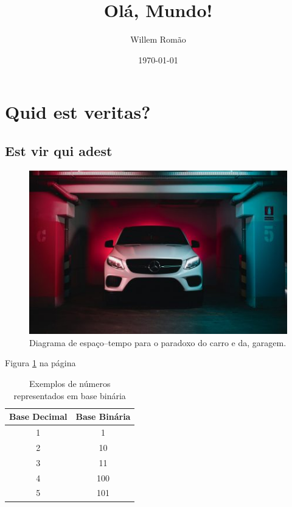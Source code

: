 \documentclass[12pt, a4paper]{article}
\title{Olá, Mundo!}
\author{Willem Romão}
\date{\today}
\begin{document}
	\maketitle
	\begin{abstract}
		\lipsum[1]
	\end{abstract}
	
	\section{Quid est veritas?}
		\lipsum[2]
		
		\subsection{Est vir qui adest}
			\lipsum[3-4]
			
			\begin{figure}[!htpb]
				\centering
				\includegraphics[width=0.5\textheight]{car-garage.jpg}
				\caption{Diagrama de espaço--tempo para o paradoxo do carro e da, 
					garagem.}
				\label{fig: car-garage}
				
			\end{figure}
		
		Figura \ref{fig: car-garage} na página \pageref{fig: car-garage}
		
		\begin{table}[!htbp]
			\centering
			\caption{Exemplos de números representados em base binária}
			\label{tab: binary}
			\begin{tabular}{c|c}
				 Base Decimal & Base Binária \\ \hline
				 1 & 1 \\
				 2 & 10 \\
				 3 & 11 \\
				 4 & 100 \\
				 5 & 101 
				 
			\end{tabular}	
		\end{table}
			
\end{document}
